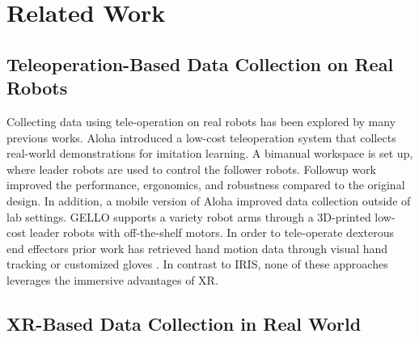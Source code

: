 \section{Related Work}

\subsection{Teleoperation-Based Data Collection on Real Robots}

Collecting data using tele-operation on real robots has been explored by many previous works. Aloha \cite{zhao2023learning} introduced a low-cost teleoperation system that collects real-world demonstrations for imitation learning. A bimanual workspace is set up, where leader robots are used to control the follower robots. Followup work \cite{aldaco2024aloha} improved the performance, ergonomics, and robustness compared to the original design. In addition, a mobile version of Aloha \cite{fu2024mobile} improved data collection outside of lab settings. GELLO \cite{wu2023gello} supports a variety robot arms through a 3D-printed low-cost leader robots with off-the-shelf motors. In order to tele-operate dexterous end effectors prior work has retrieved hand motion data through visual hand tracking \cite{Qin2023AnyTeleopAG} or customized gloves \cite{wang2024dexcap}. In contrast to IRIS, none of these approaches leverages the immersive advantages of XR.

\subsection{XR-Based Data Collection in Real World}

